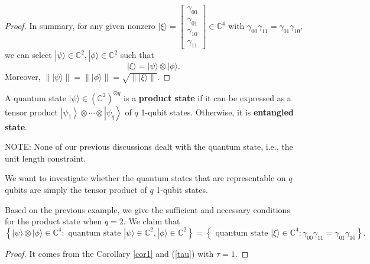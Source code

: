 \begin{example}
\begin{proof}
    In summary, for any given nonzero $|\xi\rangle=\left[\begin{array}{c}\gamma_{00} \\ \gamma_{01} \\ \gamma_{10} \\ \gamma_{11}\end{array}\right] \in \mathbb{C}^4$ with $\gamma_{00} \gamma_{11}=\gamma_{01} \gamma_{10}$, we can select $|\psi\rangle \in \mathbb{C}^2,|\phi\rangle \in \mathbb{C}^2$ such that
    \begin{equation}
    |\xi\rangle=|\psi\rangle \otimes|\phi\rangle.
\end{equation}
    Moreover, $\||\psi\rangle\|=\||\phi\rangle \|=\sqrt{\||\xi\rangle \|}$.

    \end{proof}
\end{example}

\begin{definition}
  A quantum state $|\psi\rangle \in\left(\mathbb{C}^2\right)^{\otimes q}$ is a \textbf{product state} if it can be expressed as a tensor product $\left|\psi_1\right\rangle \otimes \cdots \otimes\left|\psi_q\right\rangle$ of $q$ 1-qubit states. Otherwise, it is \textbf{entangled state}.
\end{definition}

NOTE: None of our previous discussions dealt with the quantum state, i.e., the unit length constraint.

We want to investigate whether the quantum states that are representable on $q$ qubits are simply the tensor product of $q$ 1-qubit states.

\begin{example}
        Based on the previous example,
        we give the sufficient and necessary conditions for the product state when $q = 2$. We claim that
        \begin{equation}
    \left\{|\psi\rangle \otimes|\phi\rangle \in \mathbb{C}^4:
        \text{ quantum state } |\psi\rangle \in \mathbb{C}^2,
        |\phi\rangle \in \mathbb{C}^2
        \right\} 
        =\left\{\text{ quantum state } |\xi\rangle \in \mathbb{\mathbb { C }}^{4}: \gamma_{00} \gamma_{11}=\gamma_{01} \gamma_{10}\right\}.
\end{equation}
        \begin{proof}
            It comes from the Corollary \ref{cor1} and (\ref{tau}) with $\tau=1$.
        \end{proof} 
\end{example}

